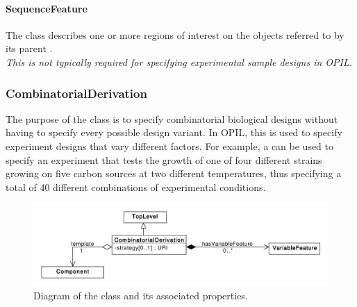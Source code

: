 \paragraph{SequenceFeature}
\label{sec:sbol:SequenceFeature}

The  class describes one or more regions of interest on the  objects referred to by its parent . 
\\{\em This is not typically required for specifying experimental sample designs in OPIL.}

\subsubsection{CombinatorialDerivation}
\label{sec:sbol:CombinatorialDerivation}

The purpose of the  class is to specify combinatorial biological designs without having to specify every possible design variant. 
In OPIL, this is used to specify experiment designs that vary different factors.
For example, a  can be used to specify an experiment that tests the growth of one of four different strains growing on five carbon sources at two different temperatures, thus specifying a total of 40 different combinations of experimental conditions.

\begin{figure}[ht]
\begin{center}
\includegraphics[scale=0.6]{sbol_uml/combinatorial_derivation}
\caption[]{Diagram of the  class and its associated properties.}
\label{uml:combinatorial_derivation}
\end{center}
\end{figure}

